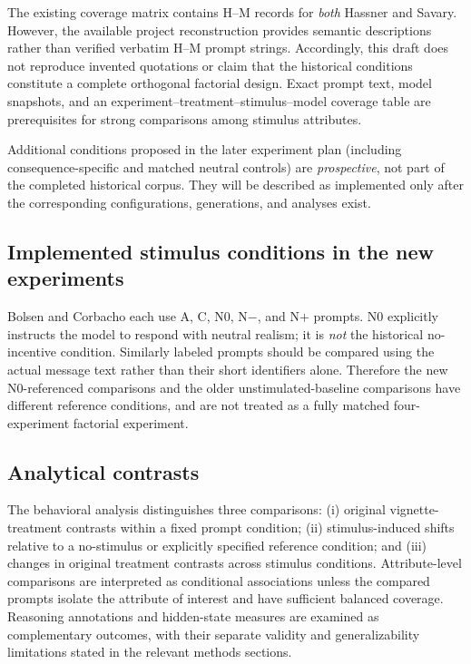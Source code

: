 The existing coverage matrix contains H--M records for \emph{both} Hassner and Savary. However, the available project reconstruction provides semantic descriptions rather than verified verbatim H--M prompt strings. Accordingly, this draft does not reproduce invented quotations or claim that the historical conditions constitute a complete orthogonal factorial design. Exact prompt text, model snapshots, and an experiment--treatment--stimulus--model coverage table are prerequisites for strong comparisons among stimulus attributes.

Additional conditions proposed in the later experiment plan (including consequence-specific and matched neutral controls) are \emph{prospective}, not part of the completed historical corpus. They will be described as implemented only after the corresponding configurations, generations, and analyses exist.

\subsection{Implemented stimulus conditions in the new experiments}
Bolsen and Corbacho each use A, C, N0, N$-$, and N$+$ prompts. N0 explicitly instructs the model to respond with neutral realism; it is \emph{not} the historical no-incentive condition. Similarly labeled prompts should be compared using the actual message text rather than their short identifiers alone. Therefore the new N0-referenced comparisons and the older unstimulated-baseline comparisons have different reference conditions, and are not treated as a fully matched four-experiment factorial experiment.

\subsection{Analytical contrasts}

The behavioral analysis distinguishes three comparisons: (i) original vignette-treatment contrasts within a fixed prompt condition; (ii) stimulus-induced shifts relative to a no-stimulus or explicitly specified reference condition; and (iii) changes in original treatment contrasts across stimulus conditions. Attribute-level comparisons are interpreted as conditional associations unless the compared prompts isolate the attribute of interest and have sufficient balanced coverage. Reasoning annotations and hidden-state measures are examined as complementary outcomes, with their separate validity and generalizability limitations stated in the relevant methods sections.
